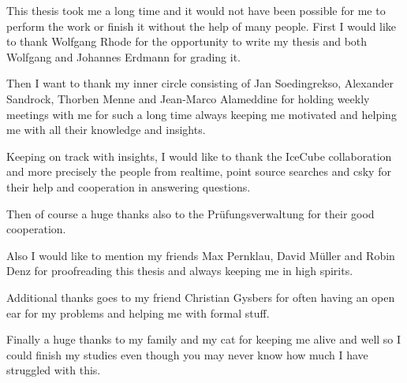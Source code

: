 This thesis took me a long time and it would not have been possible for me to perform the work or finish it without the help of many people.
First I would like to thank Wolfgang Rhode for the opportunity to write my thesis and both Wolfgang and Johannes Erdmann for grading it.

Then I want to thank my inner circle consisting of Jan Soedingrekso, Alexander Sandrock, Thorben Menne and Jean-Marco Alameddine for holding weekly meetings with me for such a long time always keeping me motivated and helping me with all their knowledge and insights.

Keeping on track with insights, I would like to thank the IceCube collaboration and more precisely the people from realtime, point source searches and csky for their help and cooperation in answering questions.

Then of course a huge thanks also to the Prüfungsverwaltung for their good cooperation.

Also I would like to mention my friends Max Pernklau, David Müller and Robin Denz for proofreading this thesis and always keeping me in high spirits.

Additional thanks goes to my friend Christian Gysbers for often having an open ear for my problems and helping me with formal stuff.

Finally a huge thanks to my family and my cat for keeping me alive and well so I could finish my studies even though you may never know how much I have struggled with this.
